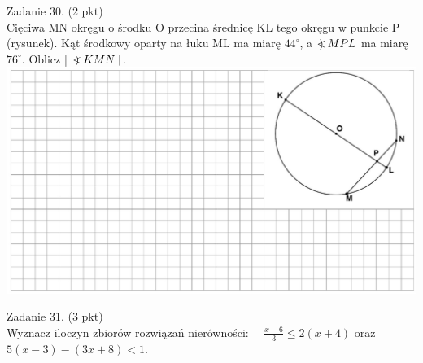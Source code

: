 \documentclass[10pt]{article}
\newcommand\Varangle{\mathop{{<\!\!\!\!\!\text{\small)}}\:}\nolimits}
\begin{document}
Zadanie 30. (2 pkt)\\
Cięciwa MN okręgu o środku O przecina średnicę KL tego okręgu w punkcie P (rysunek). Kąt środkowy oparty na łuku ML ma miarę \(44^{\circ}\), a \(\Varangle M P L\) ma miarę \(76^{\circ}\). Oblicz | \(\Varangle K M N \mid\).\\
\includegraphics[max width=\textwidth, center]{2024_11_21_a68a2ba4fc31c5fb438eg-10(1)}

Zadanie 31. (3 pkt)\\
Wyznacz iloczyn zbiorów rozwiązań nierówności: \(\quad \frac{x-6}{3} \leq 2(x+4)\) oraz \(5(x-3)-(3 x+8)<1\).
\end{document}
